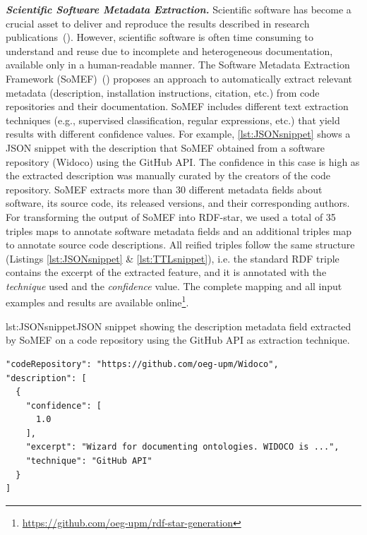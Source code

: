 \noindent\textbf{\textit{Scientific Software Metadata Extraction.}}
Scientific software has become a crucial asset to deliver and reproduce the results described in research publications~(\cite{chue_hong_fair_2021}). However, scientific software is often time consuming to understand and reuse due to incomplete and heterogeneous documentation, available only in a human-readable manner.
The Software Metadata Extraction Framework (SoMEF)~(\cite{somef}) proposes an approach to automatically extract relevant metadata (description, installation instructions, citation, etc.) from code repositories and their documentation. SoMEF includes different text extraction techniques (e.g., supervised classification, regular expressions, etc.) that yield results with different confidence values.
For example, \cref{lst:JSONsnippet} shows a JSON snippet with the description that SoMEF obtained from a software repository (Widoco) using the GitHub API.
The confidence in this case is high as the extracted description was manually curated by the creators of the code repository.
SoMEF extracts more than 30 different metadata fields about 
software, its source code, its released versions, and their corresponding authors. For transforming the output of SoMEF into RDF-star, we used a total of 35 triples maps to annotate software metadata fields and an additional triples map to annotate source code descriptions. All reified triples follow the same structure (Listings \ref{lst:JSONsnippet} \& \ref{lst:TTLsnippet}), i.e. the standard RDF triple contains the excerpt of the extracted feature, and it is annotated
with the \emph{technique} used and the \emph{confidence} value. 
The complete mapping and all input examples and results are available online\footnote{\url{https://github.com/oeg-upm/rdf-star-generation}}.
 
\noindent\hspace{0.1\linewidth}\begin{minipage}{0.8\linewidth}
\begin{captionedlisting}{lst:JSONsnippet}{JSON snippet showing the description metadata field extracted by SoMEF on a code repository using the GitHub API as extraction technique.}
\centering
\hspace{3em}
{
\begin{lstlisting}[basicstyle=\ttfamily\small,label={list:example1},columns=flexible]
"codeRepository": "https://github.com/oeg-upm/Widoco",
"description": [ 
  {
    "confidence": [
      1.0
    ],
    "excerpt": "Wizard for documenting ontologies. WIDOCO is ...",
    "technique": "GitHub API"
  }
]  
\end{lstlisting}
}
\end{captionedlisting}
\end{minipage}


